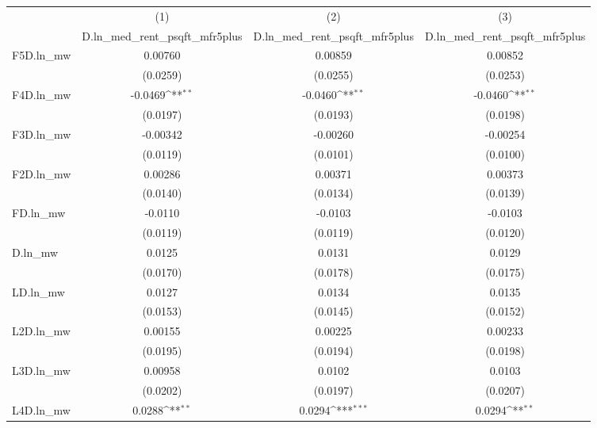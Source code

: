 {
\def\sym#1{\ifmmode^{#1}\else\(^{#1}\)\fi}
\begin{tabular}{l*{3}{c}}
\hline\hline
          &\multicolumn{1}{c}{(1)}&\multicolumn{1}{c}{(2)}&\multicolumn{1}{c}{(3)}\\
          &\multicolumn{1}{c}{D.ln\_med\_rent\_psqft\_mfr5plus}&\multicolumn{1}{c}{D.ln\_med\_rent\_psqft\_mfr5plus}&\multicolumn{1}{c}{D.ln\_med\_rent\_psqft\_mfr5plus}\\
\hline
F5D.ln\_mw &  0.00760         &  0.00859         &  0.00852         \\
          & (0.0259)         & (0.0255)         & (0.0253)         \\
[1em]
F4D.ln\_mw &  -0.0469\sym{**} &  -0.0460\sym{**} &  -0.0460\sym{**} \\
          & (0.0197)         & (0.0193)         & (0.0198)         \\
[1em]
F3D.ln\_mw & -0.00342         & -0.00260         & -0.00254         \\
          & (0.0119)         & (0.0101)         & (0.0100)         \\
[1em]
F2D.ln\_mw &  0.00286         &  0.00371         &  0.00373         \\
          & (0.0140)         & (0.0134)         & (0.0139)         \\
[1em]
FD.ln\_mw  &  -0.0110         &  -0.0103         &  -0.0103         \\
          & (0.0119)         & (0.0119)         & (0.0120)         \\
[1em]
D.ln\_mw   &   0.0125         &   0.0131         &   0.0129         \\
          & (0.0170)         & (0.0178)         & (0.0175)         \\
[1em]
LD.ln\_mw  &   0.0127         &   0.0134         &   0.0135         \\
          & (0.0153)         & (0.0145)         & (0.0152)         \\
[1em]
L2D.ln\_mw &  0.00155         &  0.00225         &  0.00233         \\
          & (0.0195)         & (0.0194)         & (0.0198)         \\
[1em]
L3D.ln\_mw &  0.00958         &   0.0102         &   0.0103         \\
          & (0.0202)         & (0.0197)         & (0.0207)         \\
[1em]
L4D.ln\_mw &   0.0288\sym{**} &   0.0294\sym{***}&   0.0294\sym{**} \\

\end{tabular}}
